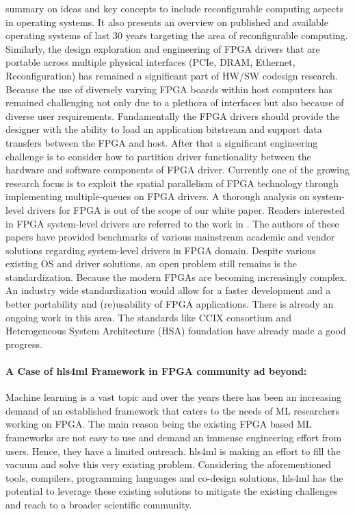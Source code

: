 summary on ideas and key concepts to include reconfigurable computing aspects in operating systems. It also presents an
overview on published and available operating systems of last 30 years targeting the area of reconfigurable computing. \newline Similarly, the design exploration and engineering of FPGA drivers that are portable across multiple physical interfaces (PCIe, DRAM, Ethernet, Reconfiguration) has remained a significant part of HW/SW codesign research. Because the use of diversely varying FPGA boards within host computers has remained challenging not only due to a plethora of interfaces but also because of diverse user requirements. Fundamentally the FPGA drivers should provide the designer with the ability to load an application bitstream and support
data transfers between the FPGA and host. After that a significant engineering challenge is to consider how to partition driver functionality between the hardware and software components of FPGA driver. Currently one of the growing research focus is to exploit the spatial parallelism of FPGA technology through implementing multiple-queues on FPGA drivers. A thorough analysis on system-level drivers for FPGA is out of the scope of our white paper. Readers interested in FPGA system-level drivers are referred to the work in \cite{fpga_drivers, fpgadrivers2}. The authors of these papers have provided benchmarks of various mainstream academic and vendor solutions regarding system-level drivers in FPGA domain. \newline Despite various existing OS and driver solutions, an open problem still remains is the standardization. Because the modern FPGAs are becoming increasingly complex. An industry wide standardization would allow for a faster development and a better portability and (re)usability of FPGA applications. There is already an ongoing work in this area. The standards like CCIX consortium \cite{ccix} and Heterogeneous System Architecture (HSA) foundation \cite{hsa}  have already made a good progress.
\paragraph{A Case of hls4ml Framework in FPGA community ad beyond:}
Machine learning is a vast topic and over the years there has been an increasing demand of an established framework that caters to the needs of ML researchers working on FPGA. The main reason being the existing FPGA based ML frameworks are not easy to use and demand an immense engineering effort from users. Hence, they have a limited outreach. hls4ml is making an effort to fill the vacuum and solve this very existing problem. Considering the aforementioned tools, compilers, programming languages and co-design solutions, hls4ml has the potential to leverage these existing solutions to mitigate the existing challenges and reach to a broader scientific community. \newline
\clearpage



